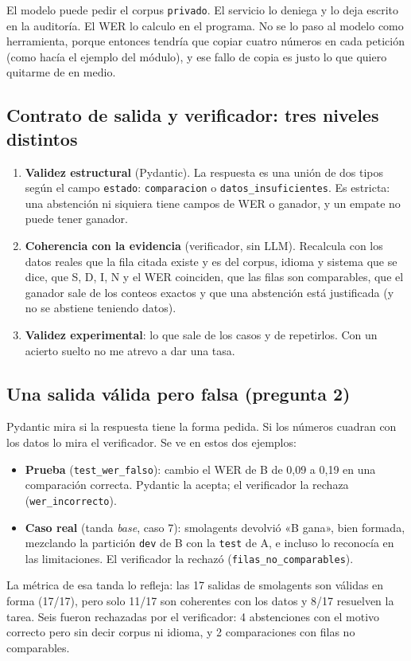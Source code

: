 \documentclass[10pt,a4paper]{article}
\newcommand{\cod}[1]{\texttt{\small #1}}
\begin{document}
El modelo puede pedir el corpus \cod{privado}. El servicio lo deniega y lo deja escrito en la auditoría.
El WER lo calculo en el programa. No se lo paso al modelo como herramienta, porque entonces tendría que copiar cuatro números en cada petición (como hacía el ejemplo del módulo), y ese fallo de copia es justo lo que quiero quitarme de en medio.

\subsection{Contrato de salida y verificador: tres niveles distintos}
\begin{enumerate}
\item \textbf{Validez estructural} (Pydantic). La respuesta es una unión de dos tipos según el campo \cod{estado}: \cod{comparacion} o \cod{datos\_insuficientes}. Es estricta: una abstención ni siquiera tiene campos de WER o ganador, y un empate no puede tener ganador.
\item \textbf{Coherencia con la evidencia} (verificador, sin LLM). Recalcula con los datos reales que la fila citada existe y es del corpus, idioma y sistema que se dice, que S, D, I, N y el WER coinciden, que las filas son comparables, que el ganador sale de los conteos exactos y que una abstención está justificada (y no se abstiene teniendo datos).
\item \textbf{Validez experimental}: lo que sale de los casos y de repetirlos. Con un acierto suelto no me atrevo a dar una tasa.
\end{enumerate}

\subsection{Una salida válida pero falsa (pregunta 2)}
Pydantic mira si la respuesta tiene la forma pedida. Si los números cuadran con los datos lo mira el verificador. Se ve en estos dos ejemplos:
\begin{itemize}
\item \textbf{Prueba} (\cod{test\_wer\_falso}): cambio el WER de B de 0,09 a 0,19 en una comparación correcta. Pydantic la acepta; el verificador la rechaza (\cod{wer\_incorrecto}).
\item \textbf{Caso real} (tanda \emph{base}, caso 7): smolagents devolvió «B gana», bien formada, mezclando la partición \cod{dev} de B con la \cod{test} de A, e incluso lo reconocía en las limitaciones. El verificador la rechazó (\cod{filas\_no\_comparables}).
\end{itemize}
La métrica de esa tanda lo refleja: las 17 salidas de smolagents son válidas en forma (17/17), pero solo 11/17 son coherentes con los datos y 8/17 resuelven la tarea. Seis fueron rechazadas por el verificador: 4 abstenciones con el motivo correcto pero sin decir corpus ni idioma, y 2 comparaciones con filas no comparables.
\end{document}

